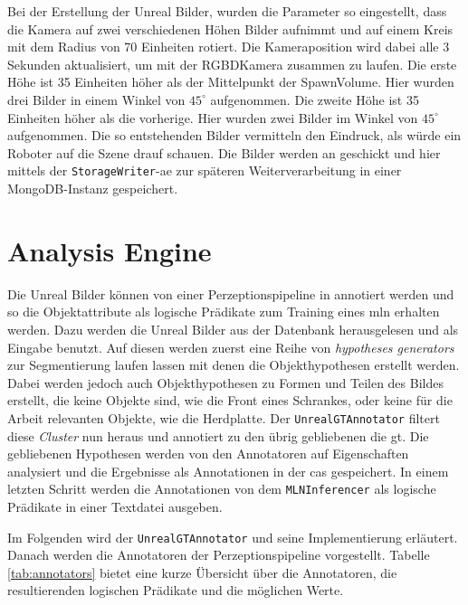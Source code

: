 Bei der Erstellung der Unreal Bilder, wurden die Parameter so eingestellt, dass die Kamera auf zwei verschiedenen Höhen Bilder aufnimmt und auf einem Kreis mit dem Radius von 70 Einheiten rotiert. Die Kameraposition wird dabei alle 3 Sekunden aktualisiert, um mit der RGBDKamera zusammen zu laufen. Die erste Höhe ist 35 Einheiten höher als der Mittelpunkt der SpawnVolume. Hier wurden drei Bilder in einem Winkel von $45^\circ$ aufgenommen. Die zweite Höhe ist 35 Einheiten höher als die vorherige. Hier wurden zwei Bilder im Winkel von $45^\circ$ aufgenommen. Die so entstehenden Bilder vermitteln den Eindruck, als würde ein Roboter auf die Szene drauf schauen. Die Bilder werden an \robosherlock geschickt und hier mittels der \texttt{StorageWriter}-\gls{ae} zur späteren Weiterverarbeitung in einer MongoDB-Instanz gespeichert.

\section{Analysis Engine}
\label{sec:analysisengine}
Die Unreal Bilder können  von einer Perzeptionspipeline in \robosherlock annotiert werden und so die Objektattribute als logische Prädikate zum Training eines \gls{mln} erhalten werden. Dazu werden die Unreal Bilder aus der Datenbank herausgelesen und als Eingabe benutzt. Auf diesen werden zuerst eine Reihe von \textit{hypotheses generators} zur Segmentierung laufen lassen mit denen die Objekthypothesen erstellt werden. Dabei werden jedoch auch Objekthypothesen zu Formen und Teilen des Bildes erstellt, die keine Objekte sind, wie die Front eines Schrankes, oder keine für die Arbeit relevanten Objekte, wie die Herdplatte. Der \texttt{UnrealGTAnnotator} filtert diese \textit{Cluster} nun heraus und annotiert zu den übrig gebliebenen die \gls{gt}. Die gebliebenen Hypothesen werden von den Annotatoren auf Eigenschaften analysiert und die Ergebnisse als Annotationen in der \gls{cas} gespeichert. In einem letzten Schritt werden die Annotationen von dem \texttt{MLNInferencer} als logische Prädikate in einer Textdatei ausgeben. \par 

Im Folgenden wird der \texttt{UnrealGTAnnotator} und seine Implementierung erläutert. Danach werden die Annotatoren der Perzeptionspipeline vorgestellt. Tabelle \ref{tab:annotators} bietet eine kurze Übersicht über die Annotatoren, die resultierenden logischen Prädikate und die möglichen Werte.

